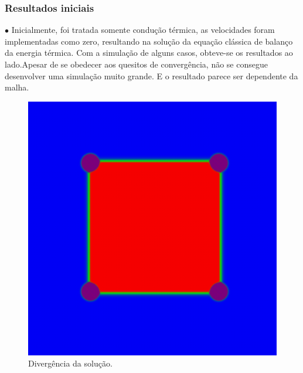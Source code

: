 \documentclass[xcolor=dvipsnames,10pt,aspectratio=169]{beamer}
\begin{document}
	\begin{frame}
		\frametitle{Resultados iniciais}
		\begin{minipage}[h!]{0.49\textwidth}
			$\bullet$  Inicialmente, foi tratada somente condução térmica, as velocidades foram implementadas como zero, resultando na solução da equação clássica de balanço da energia térmica. Com a simulação de alguns casos, obteve-se os resultados ao lado.Apesar de se obedecer aos quesitos de convergência, não se consegue desenvolver uma simulação muito grande. E o resultado parece ser dependente da malha.
		\end{minipage}
		\begin{minipage}[h!]{0.49\textwidth}
			\begin{figure}[h!]
				\centering
				\includegraphics[trim = {1cm 1cm 1cm 1cm}, clip , angle=0, scale=0.45]{images/preliminar_results_1}
				\caption{Divergência da solução.}
			\end{figure}
		\end{minipage}
	\end{frame}
\end{document}
